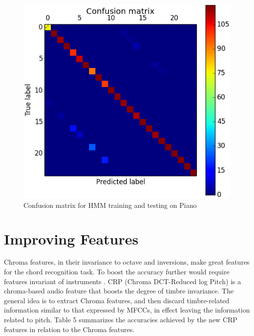 \documentclass{article}
\begin{document}
\begin{figure}[ht]
\vskip 0.2in
\begin{center}
\centerline{\includegraphics[width=\columnwidth]{conf}}
\caption{Confusion matrix for HMM training and testing on Piano}
\label{icml-historical}
\end{center}
\vskip -0.2in
\end{figure}


\section{Improving Features}

Chroma features, in their invariance to octave and inversions, make great
features for the chord recognition task. To boost the accuracy further would
require features invariant of instruments \cite{jiang}. CRP (Chroma
DCT-Reduced log Pitch) is a chroma-based audio feature that boosts the degree of
timbre invariance. The general idea is to extract Chroma features, and then
discard timbre-related information similar to that expressed by MFCCs, in effect
leaving the information related to pitch. Table 5 summarizes the accuracies
achieved by the new CRP features in relation to the Chroma features.
\end{document}
